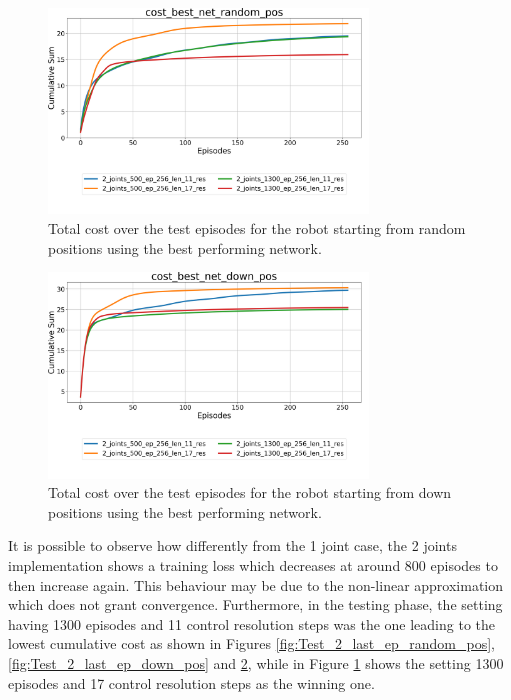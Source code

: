 \documentclass[twocolumn, a4paper]{article}
\begin{document}
\begin{figure}[H]
	\centering
	\includegraphics[width=8.5cm]{"../Figures/Summary_cost_best_net_random_pos_2J.png"}
	\caption{Total cost over the test episodes for the robot starting from
			 random positions using the best performing network.}
	\label{fig:Test_2_best_net_random_pos}
\end{figure}
\vspace{-1cm}
\begin{figure}[H]
	\centering
	\includegraphics[width=8.5cm]{"../Figures/Summary_cost_best_net_down_pos_2J.png"}
	\caption{Total cost over the test episodes for the robot starting from
			 down positions using the best performing network.}
	\label{fig:Test_2_best_net_down_pos}
	\end{figure}
It is possible to observe how differently from the 1 joint case, the 2 joints
implementation shows a training loss which decreases at around 800 episodes
to then increase again. This behaviour may be due to the non-linear
approximation which does not grant convergence.
Furthermore, in the testing phase, the setting having 1300 episodes and 11
control resolution steps was the one leading to the lowest cumulative cost
as shown in Figures \ref{fig:Test_2_last_ep_random_pos}, \ref{fig:Test_2_last_ep_down_pos} and
\ref{fig:Test_2_best_net_down_pos}, while in Figure \ref{fig:Test_2_best_net_random_pos}
shows the setting 1300 episodes and 17 control resolution steps as the winning one.
\newpage
\end{document}
